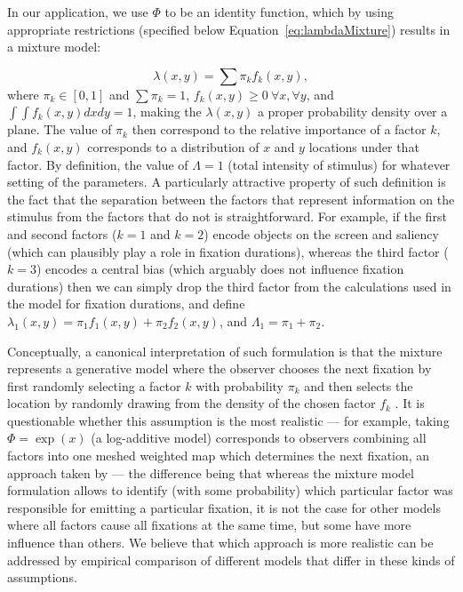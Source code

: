 \documentclass{article}
\begin{document}
In our application, we use $\Phi$ to be an identity function, which by using appropriate restrictions (specified below Equation~\ref{eq:lambdaMixture}) results in a mixture model:

\begin{equation}
\label{eq:lambdaMixture}
    \lambda(x, y) = \sum \pi_k f_k(x, y),
\end{equation}
where $\pi_k \in [0, 1]$ and $\sum \pi_k = 1$, $f_k(x, y) \geq 0~\forall x, \forall y$, and $\int \int f_k(x, y) dx dy = 1$, making the $\lambda(x, y)$ a proper probability density over a plane. The value of $\pi_k$ then correspond to the relative importance of a factor $k$, and $f_k(x, y)$ corresponds to a distribution of $x$ and $y$ locations under that factor. By definition, the value of $\Lambda = 1$ (total intensity of stimulus) for whatever setting of the parameters. A particularly attractive property of such definition is the fact that the separation between the factors that represent information on the stimulus from the factors that do not is straightforward. For example, if the first and second factors ($k=1$ and $k=2$) encode objects on the screen and saliency (which can plausibly play a role in fixation durations), whereas the third factor ($k=3$) encodes a central bias (which arguably does not influence fixation durations) then we can simply drop the third factor from the calculations used in the model for fixation durations, and define $\lambda_1(x, y) = \pi_1 f_1(x, y) + \pi_2 f_2(x, y)$, and $\Lambda_1 = \pi_1 + \pi_2$.

Conceptually, a canonical interpretation of such formulation is that the mixture represents a generative model where the observer chooses the next fixation by first randomly selecting a factor $k$ with probability $\pi_k$ and then selects the location by randomly drawing from the density of the chosen factor $f_k$ \citep{barthelme2013spatial}. It is questionable whether this assumption is the most realistic --- for example, taking $\Phi = \exp(x)$ (a log-additive model) corresponds to observers combining all factors into one meshed weighted map which determines the next fixation, an approach taken by \citet{barthelme2013spatial} --- the difference being that whereas the mixture model formulation allows to identify (with some probability) which particular factor was responsible for emitting a particular fixation, it is not the case for other models where all factors cause all fixations at the same time, but some have more influence than others. We believe that which approach is more realistic can be addressed by empirical comparison of different models that differ in these kinds of assumptions.
\end{document}

